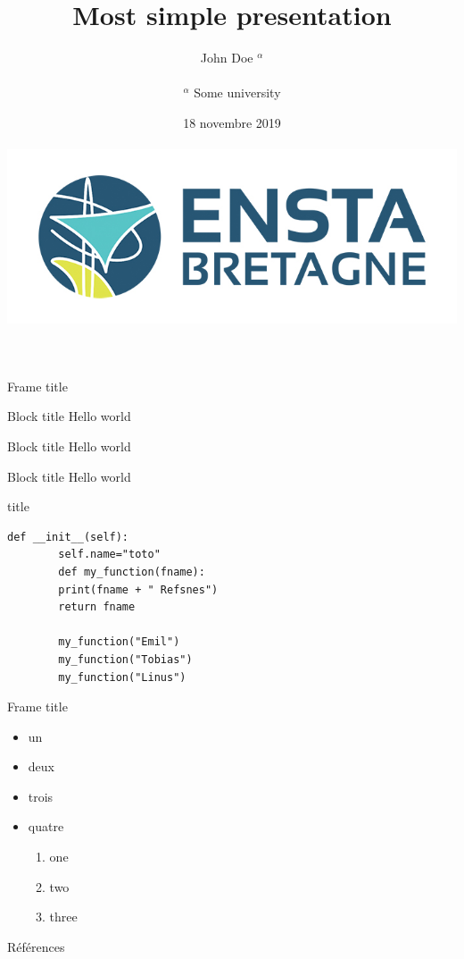 \documentclass[aspectratio=169]{beamer}
\begin{document}
	\title{Most simple presentation}
	\author{John Doe $^{\alpha}$\\~\\
		\small{$^{\alpha}$ Some university}} 
	\date{18 novembre 2019\\~\\\includegraphics[width=.5\textwidth]{images/ensta-couleur}} 
	\frame[plain]{\titlepage} 
	
	\begin{frame}{Frame title}
		\begin{exampleblock}{Block title}
			Hello world
		\end{exampleblock}
		\begin{block}{Block title}
			Hello world 
		\end{block}
		\begin{alertblock}{Block title}
			Hello world \cite{Feynman1941}
		\end{alertblock}
	\end{frame}
	\begin{frame}[fragile]{title}
		\begin{lstlisting}[style=customc]
		def __init__(self):
		self.name="toto"
		def my_function(fname):
		print(fname + " Refsnes")
		return fname
		
		my_function("Emil")
		my_function("Tobias")
		my_function("Linus") 
		\end{lstlisting}
	\end{frame}
	\begin{frame}{Frame title}
		\begin{itemize}
			\item un
			\item deux
			\item trois
			\item quatre
			\begin{enumerate}
				\item one
				\item two
				\item three
			\end{enumerate}
		\end{itemize}
	\end{frame}
	\begin{frame}{Références}
		\printbibliography
	\end{frame}
\end{document}
